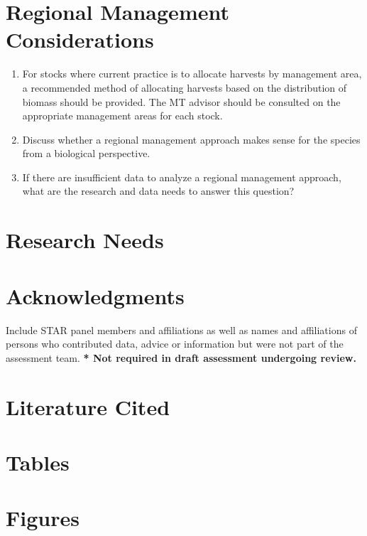 \documentclass[12pt,]{article}
\begin{document}
\section{Regional Management
Considerations}\label{regional-management-considerations}

\begin{enumerate}
\def\labelenumi{\arabic{enumi}.}
\item
  For stocks where current practice is to allocate harvests by
  management area, a recommended method of allocating harvests based on
  the distribution of biomass should be provided. The MT advisor should
  be consulted on the appropriate management areas for each stock.
\item
  Discuss whether a regional management approach makes sense for the
  species from a biological perspective.
\item
  If there are insufficient data to analyze a regional management
  approach, what are the research and data needs to answer this
  question?
\end{enumerate}

\section{Research Needs}\label{research-needs}

\section{Acknowledgments}\label{acknowledgments}

Include STAR panel members and affiliations as well as names and
affiliations of persons who contributed data, advice or information but
were not part of the assessment team.
\textbf{* Not required in draft assessment undergoing review.}

\section{Literature Cited}\label{literature-cited}

\section{Tables}\label{tables}

\section{Figures}\label{figures}
\end{document}
